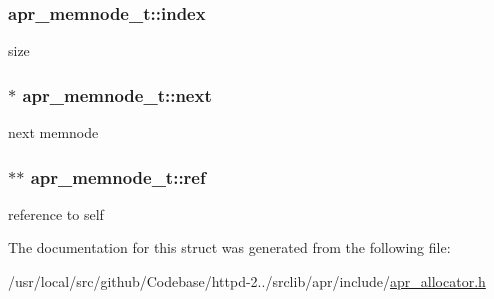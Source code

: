 \subsubsection[{\texorpdfstring{index}{index}}]{ apr\+\_\+memnode\+\_\+t\+::index}\hypertarget{structapr__memnode__t_a6188325f9e1cbcafcb0a65b7e41881a1}{}\label{structapr__memnode__t_a6188325f9e1cbcafcb0a65b7e41881a1}
size 
\subsubsection[{\texorpdfstring{next}{next}}]{$\ast$ apr\+\_\+memnode\+\_\+t\+::next}\hypertarget{structapr__memnode__t_a07dd84ca152164d6bc283dbce99f8f78}{}\label{structapr__memnode__t_a07dd84ca152164d6bc283dbce99f8f78}
next memnode 
\subsubsection[{\texorpdfstring{ref}{ref}}]{$\ast$$\ast$ apr\+\_\+memnode\+\_\+t\+::ref}\hypertarget{structapr__memnode__t_ac68a939c0c3d48498ec0c0fde409c502}{}\label{structapr__memnode__t_ac68a939c0c3d48498ec0c0fde409c502}
reference to self 

The documentation for this struct was generated from the following file\+:\begin{DoxyCompactItemize}
\item 
/usr/local/src/github/\+Codebase/httpd-\/2../srclib/apr/include/\hyperlink{apr__allocator_8h}{apr\+\_\+allocator.\+h}\end{DoxyCompactItemize}
